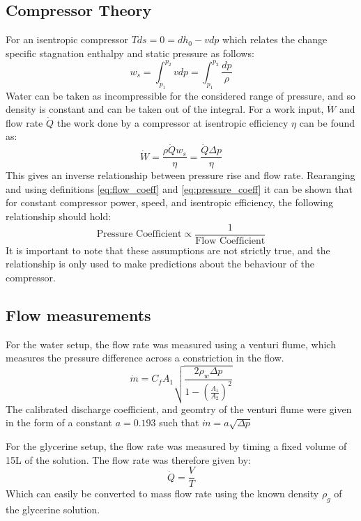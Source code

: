 \documentclass{article}
\begin{document}
\subsection{Compressor Theory}

For an isentropic compressor $Tds = 0 = dh_0 - vdp$ which relates the change specific stagnation enthalpy and static pressure as follows:
\begin{equation}
    w_s = \int_{p_1}^{p_2} vdp = \int_{p_1}^{p_2} \frac{dp}{\rho}
\end{equation}
Water can be taken as incompressible for the considered range of pressure, and so density is constant and can be taken out of the integral.
For a work input, $\dot{W}$ and flow rate $\dot{Q}$ the work done by a compressor at isentropic efficiency $\eta$ can be found as:
\begin{equation}
    \dot{W} = \frac{\rho \dot{Q} w_s}{\eta} = \frac{\dot{Q} \Delta p}{\eta} 
\end{equation}
This gives an inverse relationship between pressure rise and flow rate.
Rearanging and using definitions \ref{eq:flow_coeff} and \ref{eq:pressure_coeff} it can be shown that for constant compressor power, speed, and isentropic efficiency, the following relationship should hold:
\begin{equation}
    \text{Pressure Coefficient} \propto \frac{1}{\text{Flow Coefficient}} \label{eq:inverse_relationship}
\end{equation}
It is important to note that these assumptions are not strictly true, and the relationship is only used to make predictions about the behaviour of the compressor.

\subsection{Flow measurements}

For the water setup, the flow rate was measured using a venturi flume, which measures the pressure difference across a constriction in the flow.
\begin{equation}
    \dot{m} = C_f A_1 \sqrt{\frac{2\rho_w \Delta p}{1 - \left( \frac{A_1}{A_2} \right)^2}}
\end{equation}
The calibrated discharge coefficient, and geomtry of the venturi flume were given in the form of a constant $a=0.193$ such that $\dot{m}=a \sqrt{\Delta p}$

For the glycerine setup, the flow rate was measured by timing a fixed volume of 15L of the solution.
The flow rate was therefore given by:
\begin{equation}
    \dot{Q} = \frac{V}{T}
\end{equation}
Which can easily be converted to mass flow rate using the known density $\rho_g$ of the glycerine solution.
\end{document}
